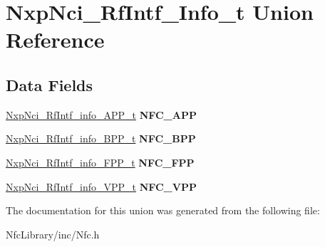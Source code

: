 \hypertarget{union_nxp_nci___rf_intf___info__t}{}\section{Nxp\+Nci\+\_\+\+Rf\+Intf\+\_\+\+Info\+\_\+t Union Reference}
\label{union_nxp_nci___rf_intf___info__t}
\subsection*{Data Fields}
\begin{DoxyCompactItemize}
\item 
\mbox{\label{union_nxp_nci___rf_intf___info__t_a02d80a709bb1801867474e396c190d22}} 
\mbox{\hyperlink{struct_nxp_nci___rf_intf__info___a_p_p__t}{Nxp\+Nci\+\_\+\+Rf\+Intf\+\_\+info\+\_\+\+A\+P\+P\+\_\+t}} {\bfseries N\+F\+C\+\_\+\+A\+PP}
\item 
\mbox{\label{union_nxp_nci___rf_intf___info__t_ad01937575690be738d6ed7f22db41253}} 
\mbox{\hyperlink{struct_nxp_nci___rf_intf__info___b_p_p__t}{Nxp\+Nci\+\_\+\+Rf\+Intf\+\_\+info\+\_\+\+B\+P\+P\+\_\+t}} {\bfseries N\+F\+C\+\_\+\+B\+PP}
\item 
\mbox{\label{union_nxp_nci___rf_intf___info__t_a6d6225e9273b80039991a7b2ca856246}} 
\mbox{\hyperlink{struct_nxp_nci___rf_intf__info___f_p_p__t}{Nxp\+Nci\+\_\+\+Rf\+Intf\+\_\+info\+\_\+\+F\+P\+P\+\_\+t}} {\bfseries N\+F\+C\+\_\+\+F\+PP}
\item 
\mbox{\label{union_nxp_nci___rf_intf___info__t_a467249236769611d6d63aa76a8f56c47}} 
\mbox{\hyperlink{struct_nxp_nci___rf_intf__info___v_p_p__t}{Nxp\+Nci\+\_\+\+Rf\+Intf\+\_\+info\+\_\+\+V\+P\+P\+\_\+t}} {\bfseries N\+F\+C\+\_\+\+V\+PP}
\end{DoxyCompactItemize}


The documentation for this union was generated from the following file\+:\begin{DoxyCompactItemize}
\item 
Nfc\+Library/inc/Nfc.\+h\end{DoxyCompactItemize}
